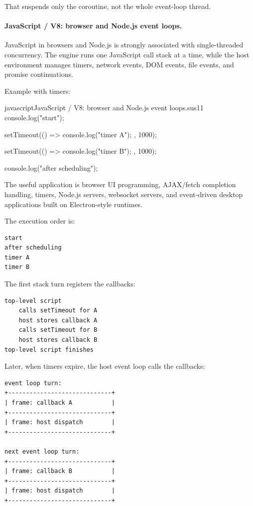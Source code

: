 That suspends only the coroutine, not the whole event-loop thread.

\paragraph{JavaScript / V8: browser and Node.js event loops.}

JavaScript in browsers and Node.js is strongly associated with single-threaded concurrency. The engine runs one JavaScript call stack at a time, while the host environment manages timers, network events, DOM events, file events, and promise continuations.

Example with timers:

\begin{codebox}[]{javascript}{JavaScript / V8: browser and Node.js event loops.}{sus11}
console.log("start");

setTimeout(() => {
    console.log("timer A");
}, 1000);

setTimeout(() => {
    console.log("timer B");
}, 1000);

console.log("after scheduling");
\end{codebox}


The useful application is browser UI programming, AJAX/fetch completion handling, timers, Node.js servers, websocket servers, and event-driven desktop applications built on Electron-style runtimes.

The execution order is:

\begin{verbatim}
start
after scheduling
timer A
timer B
\end{verbatim}

The first stack turn registers the callbacks:

\begin{verbatim}
top-level script
    calls setTimeout for A
    host stores callback A
    calls setTimeout for B
    host stores callback B
top-level script finishes
\end{verbatim}

Later, when timers expire, the host event loop calls the callbacks:

\begin{verbatim}
event loop turn:
+-----------------------------+
| frame: callback A           |
+-----------------------------+
| frame: host dispatch        |
+-----------------------------+

next event loop turn:
+-----------------------------+
| frame: callback B           |
+-----------------------------+
| frame: host dispatch        |
+-----------------------------+
\end{verbatim}

